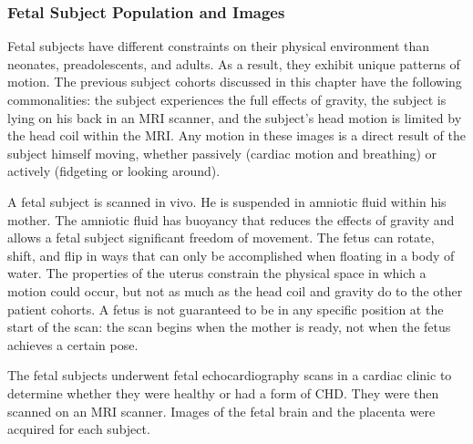 \subsubsection{Fetal Subject Population and Images}


Fetal subjects have different constraints on their physical environment than neonates, preadolescents, and adults. As a result, they exhibit unique patterns of motion. The previous subject cohorts discussed in this chapter have the following commonalities: the subject experiences the full effects of gravity, the subject is lying on his back in an MRI scanner, and the subject's head motion is limited by the head coil within the MRI. Any motion in these images is a direct result of the subject himself moving, whether passively (cardiac motion and breathing) or actively (fidgeting or looking around).

A fetal subject is scanned in vivo. He is suspended in amniotic fluid within his mother. The amniotic fluid has buoyancy that reduces the effects of gravity and allows a fetal subject significant freedom of movement. The fetus can rotate, shift, and flip in ways that can only be accomplished when floating in a body of water. The properties of the uterus constrain the physical space in which a motion could occur, but not as much as the head coil and gravity do to the other patient cohorts. A fetus is not guaranteed to be in any specific position at the start of the scan: the scan begins when the mother is ready, not when the fetus achieves a certain pose. 

The fetal subjects underwent fetal echocardiography scans in a cardiac clinic to determine whether they were healthy or had a form of CHD. They were then scanned on an MRI scanner. Images of the fetal brain and the placenta were acquired for each subject. 

